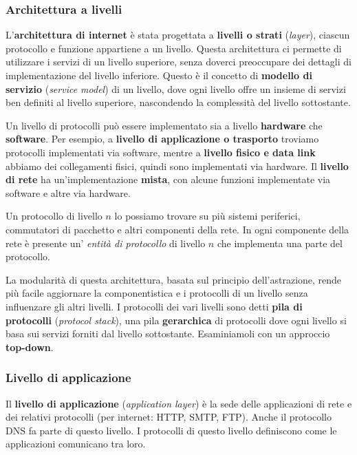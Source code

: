 \subsubsection{Architettura a livelli}
L'\textbf{architettura di internet} è stata progettata a \textbf{livelli o strati} (\textit{layer}), ciascun protocollo e funzione appartiene a un livello. Questa architettura ci permette di utilizzare i servizi di un livello superiore, senza doverci preoccupare dei dettagli di implementazione del livello inferiore. Questo è il concetto di \textbf{modello di servizio} (\textit{service model}) di un livello, dove ogni livello offre un insieme di servizi ben definiti al livello superiore, nascondendo la complessità del livello sottostante.

Un livello di protocolli può essere implementato sia a livello \textbf{hardware} che \textbf{software}. Per esempio, a \textbf{livello di applicazione o trasporto} troviamo protocolli implementati via software, mentre a \textbf{livello fisico e data link} abbiamo dei collegamenti fisici, quindi sono implementati via hardware. Il \textbf{livello di rete} ha un'implementazione \textbf{mista}, con alcune funzioni implementate via software e altre via hardware.

Un protocollo di livello $n$ lo possiamo trovare su più sistemi periferici, commutatori di pacchetto e altri componenti della rete. In ogni componente della rete è presente un' \textit{entità di protocollo} di livello $n$ che implementa una parte del protocollo.

La modularità di questa architettura, basata sul principio dell'astrazione, rende più facile aggiornare la componentistica e i protocolli di un livello senza influenzare gli altri livelli. I protocolli dei vari livelli sono detti \textbf{pila di protocolli} (\textit{protocol stack}), una pila \textbf{gerarchica} di protocolli dove ogni livello si basa sui servizi forniti dal livello sottostante. Esaminiamoli con un approccio \textbf{top-down}. 

\subsubsection*{Livello di applicazione}

Il \textbf{livello di applicazione} (\textit{application layer}) è la sede delle applicazioni di rete e dei relativi protocolli (per internet: HTTP, SMTP, FTP). Anche il protocollo DNS fa parte di questo livello. I protocolli di questo livello definiscono come le applicazioni comunicano tra loro.

